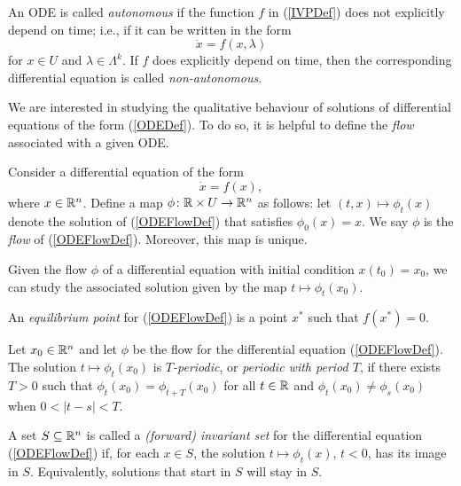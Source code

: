 \documentclass[12pt]{UOthesis}
\theoremstyle{remarkstyle}
\begin{document}
\begin{defn}
	An ODE is called \emph{autonomous} if the function $f$ in (\ref{IVPDef}) does not explicitly depend on time; i.e., if it can be written in the form
	\begin{equation}
		\dot{x}=f(x,\lambda)
		\label{AutonomousDef}
	\end{equation}
	for $x\in U$ and $\lambda\in \Lambda^k$. If $f$ does explicitly depend on time, then the corresponding differential equation is called \textit{non-autonomous}.
	\label{DefAutonomous}
\end{defn}

We are interested in studying the qualitative behaviour of solutions of differential equations of the form (\ref{ODEDef}). To do so, it is helpful to define the \textit{flow} associated with a given ODE.

\begin{defn}
	Consider a differential equation of the form
	\begin{equation}
		\dot{x}=f(x),
		\label{ODEFlowDef}
	\end{equation}
	where $x\in \mathbb R^n$. Define a map $\phi\colon \mathbb R\times U\rightarrow \mathbb R^n$ as follows: let $(t,x)\mapsto \phi_t(x)$ denote the solution of (\ref{ODEFlowDef}) that satisfies $\phi_0(x)=x$. We say $\phi$ is the \emph{flow} of (\ref{ODEFlowDef}). Moreover, this map is unique.
	\label{DefFlow}
\end{defn}

Given the flow $\phi$ of a differential equation with initial condition $x(t_0)=x_0$, we can study the associated solution given by the map $t\mapsto \phi_t(x_0)$.

\begin{defn}
	An \emph{equilibrium point} for (\ref{ODEFlowDef}) is a point $x^*$ such that $f(x^*)=0$.
	\label{DefEqPt}
\end{defn}

\begin{defn}
	Let $x_0\in \mathbb R^n$ and let $\phi$ be the flow for the differential equation (\ref{ODEFlowDef}). The solution $t\mapsto \phi_t(x_0)$ is \emph{$T$-periodic}, or \emph{periodic with period $T$}, if there exists $T>0$ such that $\phi_t(x_0)=\phi_{t+T}(x_0)$ for all $t\in \mathbb R$ and $\phi_t(x_0)\ne \phi_s(x_0)$ when $0<|t-s|<T$.
	\label{DefPeriodicSolution}
\end{defn}

\begin{defn}
	A set $S\subseteq \mathbb R^n$ is called a \emph{(forward) invariant set} for the differential equation (\ref{ODEFlowDef}) if, for each $x\in S$, the solution $t\mapsto\phi_t(x)$, $t<0$, has its image in $S$. Equivalently, solutions that start in $S$ will stay in $S$.
	\label{DefInvSet}
\end{defn}
\end{document}
